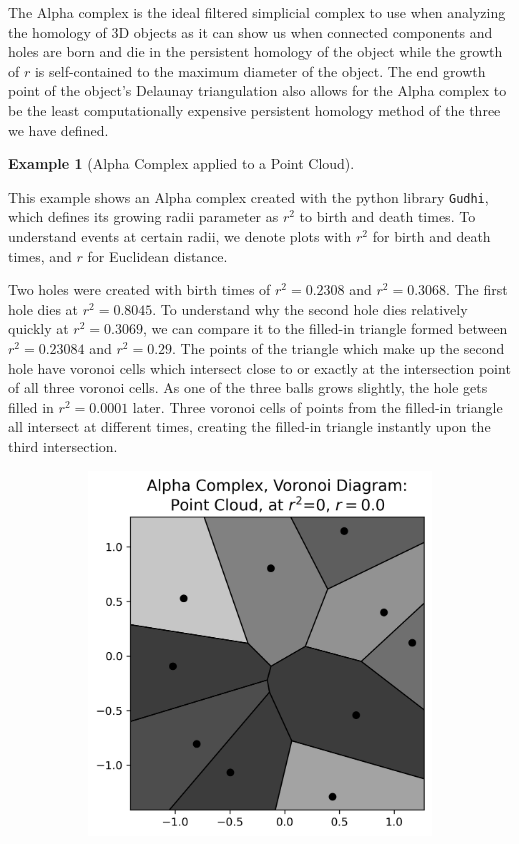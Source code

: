 \documentclass[ma]{uncgdissertationexp}
\theoremstyle{plain}
\theoremstyle{definition}
\newtheorem{example}[theorem]{Example}
\theoremstyle{remark}
\begin{document}
\par The Alpha complex is the ideal filtered simplicial complex to use when analyzing the homology of 3D objects as it can show us when connected components and holes are born and die in the persistent homology of the object while the growth of $r$ is self-contained to the maximum diameter of the object. The end growth point of the object's Delaunay triangulation also allows for the Alpha complex to be the least computationally expensive persistent homology method of the three we have defined.

\newpage
\begin{example}[Alpha Complex applied to a Point Cloud]\label{ex:point_cloud_alpha}
\par This example shows an Alpha complex created with the python library \verb"Gudhi", which defines its growing radii parameter as $r^{2}$ to birth and death times. To understand events at certain radii, we denote plots with $r^{2}$ for birth and death times, and $r$ for Euclidean distance.
\par Two holes were created with birth times of $r^{2}=0.2308$ and $r^{2}=0.3068$. The first hole dies at $r^{2}=0.8045$. To understand why the second hole dies relatively quickly at $r^{2}=0.3069$, we can compare it to the filled-in triangle formed between $r^{2} = 0.23084$ and $r^{2} = 0.29$. The points of the triangle which make up the second hole have voronoi cells which intersect close to or exactly at the intersection point of all three voronoi cells. As one of the three balls grows slightly, the hole gets filled in $r^{2}=0.0001$ later. Three voronoi cells of points from the filled-in triangle all intersect at different times, creating the filled-in triangle instantly upon the third intersection.
\begin{figure}[H]
    \centering
    \begin{subfigure}[b]{0.26\textwidth}
        \includegraphics[width=\textwidth]{point_cloud_plot_alpha_0.png}

\end{subfigure}
\end{figure}
\end{example}
\end{document}
